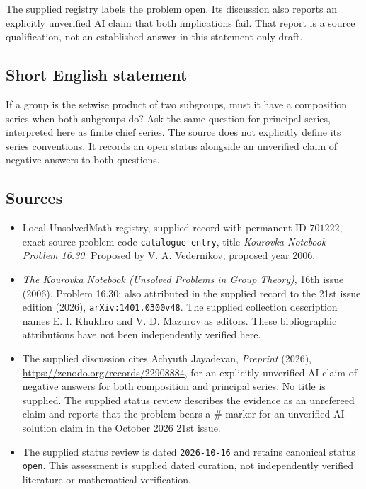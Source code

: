 \documentclass[11pt]{article}
\begin{document}
The supplied registry labels the problem open. Its discussion also reports an explicitly unverified AI claim that both implications fail. That report is a source qualification, not an established answer in this statement-only draft.
\subsection{Short English statement}
If a group is the setwise product of two subgroups, must it have a composition series when both subgroups do? Ask the same question for principal series, interpreted here as finite chief series. The source does not explicitly define its series conventions. It records an open status alongside an unverified claim of negative answers to both questions.
\subsection{Sources}
\begin{itemize}
\item Local UnsolvedMath registry, supplied record with permanent ID \(701222\), exact source problem code \texttt{catalogue entry}, title \emph{Kourovka Notebook Problem 16.30}. Proposed by V. A. Vedernikov; proposed year 2006.
\item \emph{The Kourovka Notebook (Unsolved Problems in Group Theory)}, 16th issue (2006), Problem 16.30; also attributed in the supplied record to the 21st issue edition (2026), \texttt{arXiv:1401.0300v48}. The supplied collection description names E. I. Khukhro and V. D. Mazurov as editors. These bibliographic attributions have not been independently verified here.
\item The supplied discussion cites Achyuth Jayadevan, \emph{Preprint} (2026), \url{https://zenodo.org/records/22908884}, for an explicitly unverified AI claim of negative answers for both composition and principal series. No title is supplied. The supplied status review describes the evidence as an unrefereed claim and reports that the problem bears a \(\#\) marker for an unverified AI solution claim in the October 2026 21st issue.
\item The supplied status review is dated \texttt{2026-10-16} and retains canonical status \texttt{open}. This assessment is supplied dated curation, not independently verified literature or mathematical verification.
\end{itemize}
\end{document}
